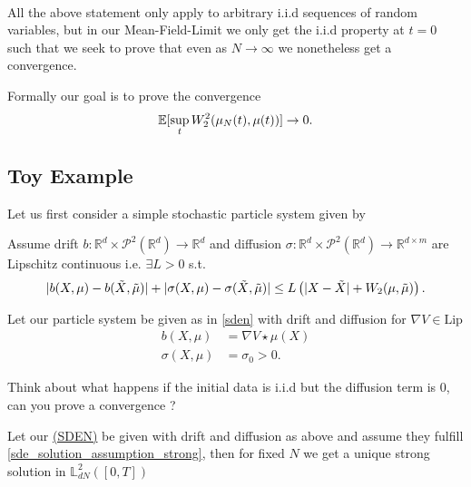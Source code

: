 \hspace{0mm}\\[1ex]
All the above statement only apply to arbitrary i.i.d sequences of random variables, but in our Mean-Field-Limit we only get 
the i.i.d property at $t=0$ such that we seek to prove that even as $N \to \infty$ we nonetheless get a convergence.
\begin{remark}
 Formally our goal is to prove the convergence 
 \begin{align*}
   \mathbb{E}[\sup_{t} W_2^{2}(\mu_N(t),\mu(t))  ] \to 0
 .\end{align*}
\end{remark}
\newpage
\subsection{Toy Example}
Let us first consider a simple stochastic particle system given by 
\begin{assumption}\label{sde_solution_assumption_strong}
Assume drift  $b : \mathbb{R}^{d} \times  \mathcal{P}^2(\mathbb{R}^{d} ) \to  \mathbb{R}^{d} $ and diffusion $\sigma : \mathbb{R}^{d} \times  \mathcal{P}^2(\mathbb{R}^{d} ) \to \mathbb{R}^{d \times  m}  $   are Lipschitz continuous i.e. $\exists  L >0$ s.t.
 \begin{align*}
  \lvert b(X,\mu ) - b(\tilde{X},\tilde{\mu }  )\rvert + \lvert\sigma(X,\mu ) - \sigma(\tilde{X},\tilde{\mu }  )\rvert \le  L \left( \lvert X - \tilde{X} \rvert + W_2(\mu ,\tilde{\mu } ) \right) 
 .\end{align*}
\end{assumption}
\begin{example}
  Let our particle system be given as in \autoref{sden} with drift and diffusion for $\nabla V \in  \text{Lip}$
 \begin{align*}
   b(X,\mu )&= \nabla V \star  \mu(X)\\
   \sigma(X,\mu ) &= \sigma_0 >0
 .\end{align*}
\end{example}
\begin{exercise}
 Think about what happens if the initial data is i.i.d but the diffusion term is 0, can you prove a convergence ?
\end{exercise}
\begin{theorem}
  Let our \hyperref[sden]{(SDEN)} be given with drift and diffusion as above and assume they fulfill \autoref{sde_solution_assumption_strong}, then  
  for fixed $N$ we get a unique strong solution in $\mathbb{L}^{2}_{dN}([0,T]) $
\end{theorem}
